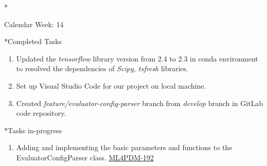 \documentclass[11pt,a4paper]{article}
\begin{document}
\newpage
\begin{section}*{Calendar Week: 14 \hfill \date{09 April, 2021}}
 \begin{subsection}*{Completed Tasks}
     \begin{enumerate}
         \item Updated the \textit{tensorflow} library version from 2.4 to 2.3 in conda environment to resolved the dependencies of \textit{Scipy, tsfresh} libraries.
         \item Set up Visual Studio Code for our project on local machine.
         \item Created \textit{feature/evaluator-config-parser} branch from \textit{develop} branch in GitLab code repository.
     \end{enumerate}
 \end{subsection}
 \begin{subsection}*{Tasks in-progress}
     \begin{enumerate}
         \item Adding and implementing the basic parameters and functions to the EvaluatorConfigParser class. \href{https://ml4pdm.atlassian.net/browse/ML4PDM-192}{ML4PDM-192}
     \end{enumerate}
 \end{subsection}
\end{section}
\end{document}
